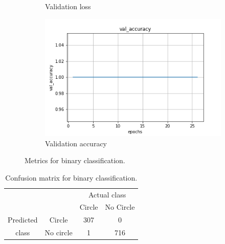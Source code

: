 \documentclass{article}
\begin{document}
\begin{figure}
\begin{subfigure}[b]{0.45\textwidth}
    \caption{Validation loss}
  \end{subfigure}
%
\begin{subfigure}[b]{0.45\textwidth}
    \centering
    \includegraphics[totalheight=4cm]{circle_id/binary/plotval_accuracy.png}
    \caption{Validation accuracy}
  \end{subfigure}
\caption{\label{fig:binarymetrics} Metrics for binary classification.}
\end{figure}
%
\begin{table}
\begin{center}
  \begin{tabular}{cccc}
    \cline{3-4}
    & & \multicolumn{2}{|c|}{Actual class}  \\
    \cline{3-4}
    & & \multicolumn{1}{|c|}{Circle} &  \multicolumn{1}{|c|}{No Circle}\\
    \hline
    \multicolumn{1}{|c}{Predicted} & \multicolumn{1}{|c|}{Circle} & \multicolumn{1}{|c|}{307} & \multicolumn{1}{|c|}{0} \\
    \cline{2-4}
    \multicolumn{1}{|c}{class} & \multicolumn{1}{|c|}{No circle} & \multicolumn{1}{|c|}{1} & \multicolumn{1}{|c|}{716}\\
    \hline
  \end{tabular}
\end{center}
\caption{\label{tab:confusionbinary} Confusion matrix for binary classification.}
\end{table}
%
\end{document}
